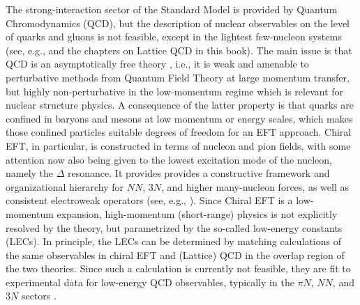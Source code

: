 {The strong-interaction sector of the Standard Model is provided by
Quantum Chromodynamics (QCD), but the description of nuclear
observables on the level of quarks and gluons is not feasible, except
in the lightest few-nucleon systems (see, e.g., \cite{Detmold:2015xw}
and the chapters on Lattice QCD in this book). The main issue is that
QCD is an asymptotically free theory
\cite{Gross:1973pd,Politzer:1973lq}, i.e., it is weak and amenable to
perturbative methods from Quantum Field Theory at large momentum
transfer, but highly non-perturbative in the low-momentum regime which
is relevant for nuclear structure physics. A consequence of the latter
property is that quarks are confined in baryons and mesons at low
momentum or energy scales, which makes those confined particles
suitable degrees of freedom for an EFT approach. Chiral EFT, in
particular, is constructed in terms of nucleon and pion fields, with
some attention now also being given to the lowest excitation mode of
the nucleon, namely the $\Delta$ resonance.  It provides provides a
constructive framework and organizational hierarchy for $NN$, $3N$,
and higher many-nucleon forces, as well as consistent electroweak
operators (see, e.g.,
\cite{Epelbaum:2009ve,Machleidt:2011bh,Epelbaum:2015gf,Entem:2015qf,Gezerlis:2014zr,Lynn:2016ec,Pastore:2009zr,Pastore:2011dq,Piarulli:2013vn,Kolling:2009yq,Kolling:2011bh}).
Since Chiral EFT is a low-momentum expansion, high-momentum
(short-range) physics is not explicitly resolved by the theory, but
parametrized by the so-called low-energy constants (LECs).  In
principle, the LECs can be determined by matching calculations of the
same observables in chiral EFT and (Lattice) QCD in the overlap region
of the two theories. Since such a calculation is currently not
feasible, they are fit to experimental data for low-energy QCD
observables, typically in the $\pi{}N$, $NN$, and $3N$ sectors
\cite{Epelbaum:2009ve,Machleidt:2011bh,Ekstrom:2015fk,Shirokov:2016wo}.

}

